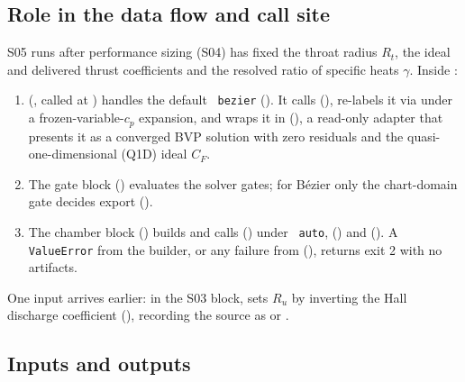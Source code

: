 \subsection{Role in the data flow and call site}

S05 runs after performance sizing (S04) has fixed the throat radius $R_t$, the ideal and delivered thrust
coefficients and the resolved ratio of specific heats $\gamma$. Inside :

\begin{enumerate}
  \item {} (, called at ) handles the default
  ~\texttt{bezier} (). It calls 
  (), re-labels it via  under a
  frozen-variable-$c_p$ expansion, and wraps it in  (), a
  read-only adapter that presents it as a converged BVP solution with zero residuals and the
  quasi-one-dimensional (Q1D) ideal $C_F$.
  \item The gate block () evaluates the solver gates; for B\'ezier only the chart-domain gate
  decides export ().
  \item The chamber block () builds  and calls
   () under ~\texttt{auto},
   () and  (). A \texttt{ValueError} from
  the builder, or any failure from  (), returns exit 2
  with no artifacts.
\end{enumerate}
One input arrives earlier: in the S03 block,  sets $R_u$ by inverting the Hall discharge
coefficient (), recording the source as  or
.

\subsection{Inputs and outputs}


